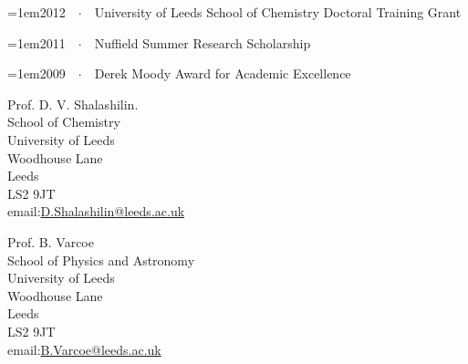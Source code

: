 \documentclass{scrartcl}
\newcommand{\Description}[1]{\hangindent=1em\hangafter=0\noindent\footnotesize{#1}\par\normalsize\vspace{1em}} %
\begin{document}
\begin{cv}{}
\noindent{}\vspace{1em}

\Description{2012\ \ $\cdotp$\ \ University of Leeds School of Chemistry Doctoral Training Grant}

\vspace{-0.5em} %

\Description{2011\ \ $\cdotp$\ \ Nuffield Summer Research Scholarship}

\vspace{-0.5em} %

\Description{2009\ \ $\cdotp$\ \ Derek Moody Award for Academic Excellence}


\vspace{1em} %

\newpage
\noindent{}\vspace{1em}

\begin{multicols}{2}
	\noindent Prof. D. V. Shalashilin.\\
	School of Chemistry\\
	University of Leeds\\
	Woodhouse Lane\\
	Leeds\\
	LS2 9JT\\
	email:\href{mailto:D.Shalashilin@leeds.ac.uk}{D.Shalashilin@leeds.ac.uk}
	\vfill
	\columnbreak

	\noindent Prof. B. Varcoe\\
	School of Physics and Astronomy\\
	University of Leeds\\
	Woodhouse Lane\\
	Leeds\\
	LS2 9JT\\
	email:\href{mailto:B.Varcoe@leeds.ac.uk}{B.Varcoe@leeds.ac.uk}
\end{multicols}

\end{cv}
\end{document}

